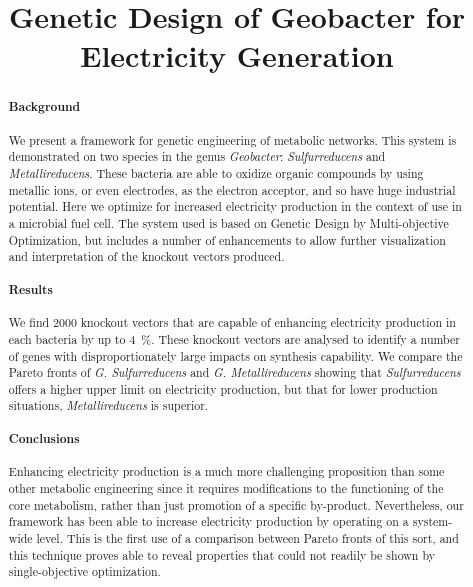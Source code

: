 \documentclass[a4paper,twocolumn]{article}
\begin{document}
\title{Genetic Design of Geobacter for Electricity Generation}
\maketitle
\begin{abstract}

\paragraph{Background}
We present a framework for genetic engineering of metabolic networks. This system is demonstrated on two species in the genus {\it Geobacter}: {\it Sulfurreducens} and {\it Metallireducens}. These bacteria are able to oxidize organic compounds by using metallic ions, or even electrodes, as the electron acceptor, and so have huge industrial potential. Here we optimize for increased electricity production in the context of use in a microbial fuel cell. The system used is based on Genetic Design by Multi-objective Optimization, but includes a number of enhancements to allow further visualization and interpretation of the knockout vectors produced.
\paragraph{Results}
We find 2000 knockout vectors that are capable of enhancing electricity production in each bacteria by up to \SI{4}{\percent}. These knockout vectors are analysed to identify a number of genes with disproportionately large impacts on synthesis capability. We compare the Pareto fronts of {\it G. Sulfurreducens} and {\it G. Metallireducens} showing that {\it Sulfurreducens} offers a higher upper limit on electricity production, but that for lower production situations, {\it Metallireducens} is superior.
\paragraph{Conclusions}
Enhancing electricity production is a much more challenging proposition than some other metabolic engineering since it requires modifications to the functioning of the core metabolism, rather than just promotion of a specific by-product. Nevertheless, our framework has been able to increase electricity production by operating on a system-wide level. This is the first use of a comparison between Pareto fronts of this sort, and this technique proves able to reveal properties that could not readily be shown by single-objective optimization.

\end{abstract}
\end{document}
